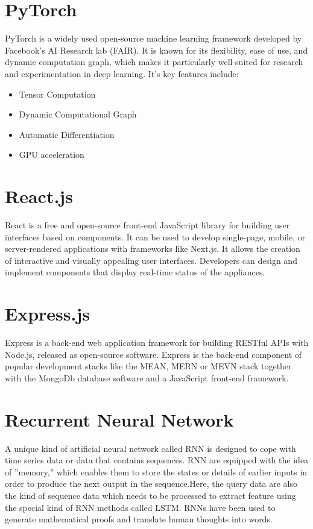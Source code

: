 \section{PyTorch}
PyTorch is a widely used open-source machine learning framework developed by Facebook's AI Research lab (FAIR). It is known for its flexibility, ease of use, and dynamic computation graph, which makes it particularly well-suited for research and experimentation in deep learning.
It's key features include:
\begin{itemize}
        \setlength\itemsep{1.5pt}
          \item Tensor Computation
          \item Dynamic Computational Graph
          \item Automatic Differentiation
          \item GPU acceleration 
        \end{itemize}
\section{React.js}
React is a free and open-source front-end JavaScript library for building user interfaces based on components. It can be used to develop single-page, mobile, or server-rendered applications with frameworks like Next.js. It allows the creation of interactive and visually appealing user interfaces. Developers can design and implement components that display real-time status of the appliances.
\section{Express.js}
Express is a back-end web application framework for building RESTful APIs with Node.js, released as open-source software. Express is the back-end component of popular development stacks like the MEAN, MERN or MEVN stack together with the MongoDb database software and a JavaScript front-end framework.

\section{Recurrent Neural Network}
A unique kind of artificial neural network called RNN is designed to cope with time series data or data that contains sequences. RNN are equipped with the idea of ”memory,” which enables them to store the states or details of earlier inputs in order to produce the next output in the sequence.Here, the query data are also the kind of sequence data which needs to be processed to extract feature using the special kind of RNN methods called LSTM. RNNs have been used to generate mathematical proofs and translate human thoughts into words.

